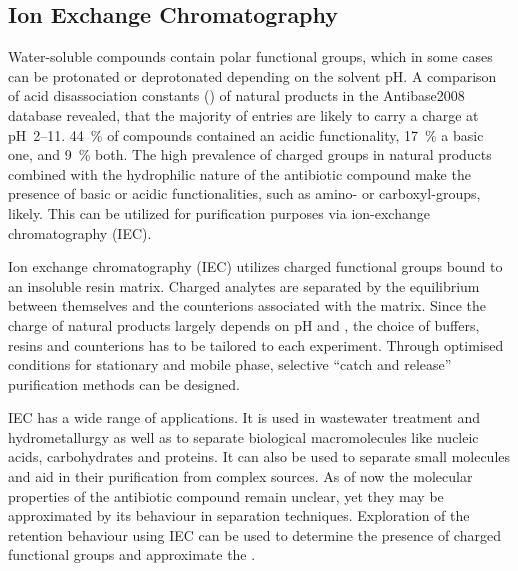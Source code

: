 

\subsection{Ion Exchange Chromatography} %
\label{sub:results_ion_exchange_chromatography}

Water-soluble compounds contain polar functional groups, which in some cases can be protonated or deprotonated depending on the solvent pH.
A comparison of acid disassociation constants (\pka{}) of natural products in the Antibase2008 database revealed, that the majority of entries are likely to carry a charge at pH~2--11.\autocite{Mansson2010}
44~\% of compounds contained an acidic functionality, 17~\% a basic one, and 9~\% both.
The high prevalence of charged groups in natural products combined with the
hydrophilic nature of the antibiotic compound make the presence of basic or
acidic functionalities, such as amino- or carboxyl-groups, likely.
This can be utilized for purification purposes via ion-exchange chromatography (IEC).

Ion exchange chromatography (IEC) utilizes charged functional groups bound to an insoluble resin matrix.\autocite{Dragull2012}
Charged analytes are separated by the equilibrium between themselves and the counterions associated with the matrix.
Since the charge of natural products largely depends on pH and \pka, the choice of buffers, resins and counterions has
to be tailored to each experiment.
Through optimised conditions for stationary and mobile phase, selective ``catch and release'' purification methods can be designed.

IEC has a wide range of applications.
It is used in wastewater treatment and hydrometallurgy as well as to separate biological macromolecules like nucleic acids, carbohydrates and proteins.\autocite{Dragull2012,Alexandratos2009,Lee1996,Kenney1992}
It can also be used to separate small molecules and aid in their purification from complex sources.\autocite{Dragull2012,Hoffmann2009a,Katavic2007}
As of now the molecular properties of the antibiotic compound remain unclear, yet they may be approximated by its behaviour in separation techniques.
Exploration of the retention behaviour using IEC can be used to determine the presence of charged functional groups and approximate the \pka{}.

